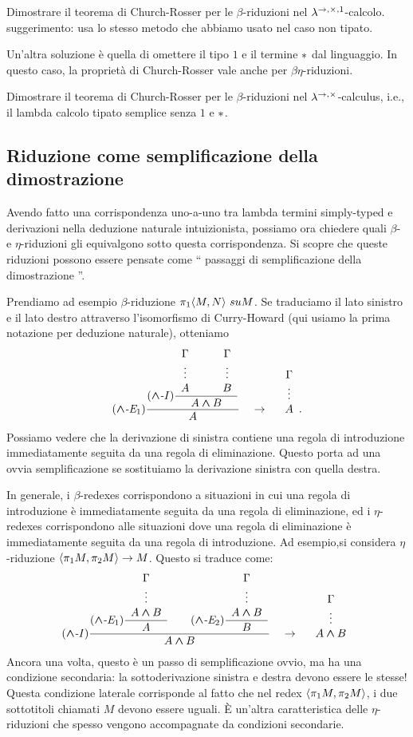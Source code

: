 \documentclass{article}
\begin{document}
\begin{exercise}
	Dimostrare il teorema di Church-Rosser per le $\beta$-riduzioni nel
	$\lambda^{\to,\times,1}$-calcolo. suggerimento: usa lo stesso metodo che abbiamo usato nel caso non tipato.
\end{exercise}

Un'altra soluzione \`e quella di omettere il tipo $1$ e il termine ${*}$ dal
linguaggio. In questo caso, la propriet\`a di Church-Rosser vale anche per
$\beta\eta$-riduzioni.

\begin{exercise}
	Dimostrare il teorema di Church-Rosser per le $\beta$-riduzioni nel
	$\lambda^{\to,\times}$-calculus, i.e., il lambda calcolo tipato semplice 
	senza $1$ e ${*}$.
\end{exercise}

\subsection{Riduzione come semplificazione della dimostrazione}

Avendo fatto una corrispondenza uno-a-uno tra lambda termini simply-typed
e derivazioni nella deduzione naturale intuizionista, possiamo ora chiedere 
quali $\beta$- e $\eta$-riduzioni gli equivalgono sotto questa corrispondenza.
Si scopre che queste riduzioni possono essere pensate come `` passaggi di semplificazione della dimostrazione ''.

Prendiamo ad esempio $\beta$-riduzione $\pi_1\langle M,N\rangle\ su M $.
Se traduciamo il lato sinistro e il lato destro attraverso l'isomorfismo di Curry-Howard 
(qui usiamo la prima notazione per deduzione naturale), otteniamo
\[ \trule{$\cand$-E$_1$}\deriv{\trule{$\cand$-I}\deriv{\ideriv{\Gamma}{A}\sep\ideriv{\Gamma}{B}}{A\cand B}}{A}
\ssep\to\ssep \ideriv{\Gamma}{A}.
\]
Possiamo vedere che la derivazione di sinistra contiene una regola di 
introduzione immediatamente seguita da una regola di eliminazione. 
Questo porta ad una ovvia semplificazione se sostituiamo la derivazione sinistra con quella destra.

In generale, i $\beta$-redexes corrispondono a situazioni in cui
una regola di introduzione \`e immediatamente seguita da una regola di 
eliminazione, ed i $\eta$-redexes corrispondono alle situazioni dove 
una regola di eliminazione \`e immediatamente seguita da una regola di introduzione.
Ad esempio,si considera $\eta$-riduzione  $\langle\pi_1 M,\pi_2 M\rangle \to M$. 
Questo si traduce come:
\[
\trule{$\cand$-I}\deriv{\trule{$\cand$-E$_1$}\deriv{\ideriv{\Gamma}{A\cand
			B}}{A}\sep\trule{$\cand$-E$_2$}\deriv{\ideriv{\Gamma}{A\cand
			B}}{B}}{A\cand B}
\ssep\to\ssep \ideriv{\Gamma}{A\cand B}
\]
Ancora una volta, questo \`e un passo di semplificazione ovvio, ma ha una condizione secondaria: 
la sottoderivazione sinistra e destra devono essere le stesse! 
Questa condizione laterale corrisponde al fatto che nel redex $\langle\pi_1
	M,\pi_2 M\rangle$, i due sottotitoli chiamati $M$ devono essere uguali.
\`E un'altra caratteristica delle $\eta$-riduzioni che spesso vengono accompagnate 
da condizioni secondarie.
\end{document}
